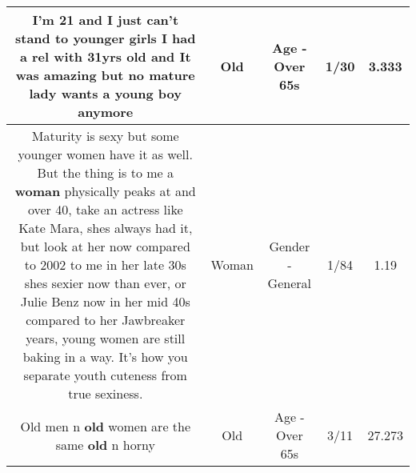 \documentclass[11pt]{article}
\newlength\mylength
\begin{document}
\begin{center}
\begin{longtable}{|C{.65\mylength}|C{.30\mylength}|C{.12\mylength}|C{.12\mylength}|C{.12\mylength}|}
  \small I'm 21 and I just can't stand to younger girls I had a rel with 31yrs \textbf{old} and It was amazing but no mature lady wants a young boy anymore\normalsize   & Old & Age - Over 65s & 1/30 & 3.333 \\  \hline
  \small Maturity is sexy but some younger women have it as well. But the thing is to me a \textbf{woman} physically peaks at and over 40, take an actress like Kate Mara, shes always had it, but look at her now compared to 2002 to me in her late 30s shes sexier now than ever, or Julie Benz now in her mid 40s compared to her Jawbreaker years, young women are still baking in a way. It's how you separate youth cuteness from true sexiness.\normalsize   & Woman & Gender - General & 1/84 & 1.19 \\  \hline
  \small Old men n \textbf{old} women are the same \textbf{old} n horny\normalsize   & Old & Age - Over 65s & 3/11 & 27.273 \\  \hline

\end{longtable}
\end{center}
\end{document}
